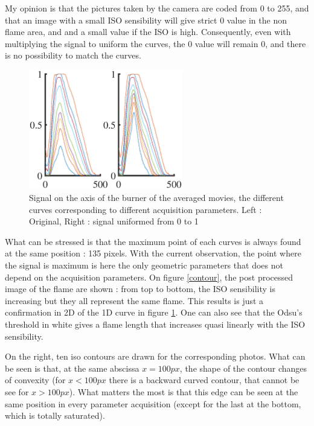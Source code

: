 My opinion is that the pictures taken by the camera are coded from 0 to 255, and that an image with a small ISO sensibility will give strict 0 value in the non flame area, and and a small value if the ISO is high. Consequently, even with multiplying the signal to uniform the curves, the 0 value will remain 0, and there is no possibility to match the curves.
\begin{figure}[h!]
  \centering
\includegraphics[width=0.60\textwidth]{fig/Signal_comparison.eps}

  \caption{Signal on the axis of the burner of the averaged movies, the different curves corresponding to different acquisition parameters. Left : Original, Right : signal uniformed from 0  to 1}
 \label{signal_comparison}
\end{figure}
What can be stressed is that the maximum point of each curves is always found at the same position  : 135 pixels. With the current observation, the point where the signal is maximum is here the only geometric parameters that does not depend on the acquisition parameters. On figure \ref{contour}, the post processed image of the flame are shown : from top to bottom, the ISO sensibility is increasing but they all represent the same flame. This results is just a confirmation in 2D of the 1D curve in figure \ref{signal_comparison}. One can also see that the Odsu's threshold in white gives a flame length that increases quasi linearly with the ISO sensibility.

On the right, ten iso contours are drawn for the corresponding photos. What can be seen is that, at the same abscissa $x=100px$, the shape of the contour changes of convexity (for $x <100px$ there is a backward curved contour, that cannot be see for $x>100px$). What matters the most is that this edge can be seen at the same position in every parameter acquisition (except for the last at the bottom, which is totally saturated).

